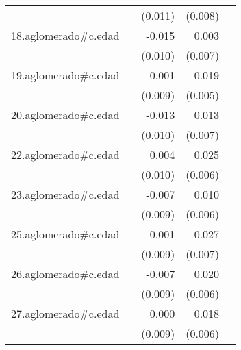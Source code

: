 {\begin{longtable}{l*{4}{D{.}{.}{-1}}}
            &                     &     (0.011)         &     (0.008)         &                     \\
\addlinespace
18.aglomerado#c.edad&                     &      -0.015         &       0.003         &                     \\
            &                     &     (0.010)         &     (0.007)         &                     \\
\addlinespace
19.aglomerado#c.edad&                     &      -0.001         &       0.019\sym{***}&                     \\
            &                     &     (0.009)         &     (0.005)         &                     \\
\addlinespace
20.aglomerado#c.edad&                     &      -0.013         &       0.013         &                     \\
            &                     &     (0.010)         &     (0.007)         &                     \\
\addlinespace
22.aglomerado#c.edad&                     &       0.004         &       0.025\sym{***}&                     \\
            &                     &     (0.010)         &     (0.006)         &                     \\
\addlinespace
23.aglomerado#c.edad&                     &      -0.007         &       0.010         &                     \\
            &                     &     (0.009)         &     (0.006)         &                     \\
\addlinespace
25.aglomerado#c.edad&                     &       0.001         &       0.027\sym{***}&                     \\
            &                     &     (0.009)         &     (0.007)         &                     \\
\addlinespace
26.aglomerado#c.edad&                     &      -0.007         &       0.020\sym{**} &                     \\
            &                     &     (0.009)         &     (0.006)         &                     \\
\addlinespace
27.aglomerado#c.edad&                     &       0.000         &       0.018\sym{**} &                     \\
            &                     &     (0.009)         &     (0.006)         &                     \\

\end{longtable}}
